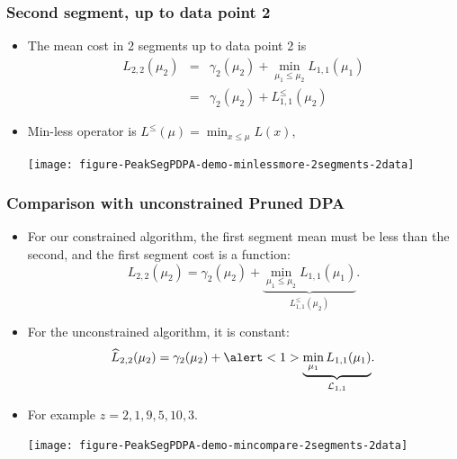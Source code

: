 \documentclass{beamer}
\begin{document}
\begin{frame}[fragile]
  \frametitle{Second segment, up to data point 2}
  \begin{itemize}
  \item The mean cost in 2 segments up to data point 2 is
\begin{eqnarray*}
  L_{2,2}(\mu_2) 
  &=&  \gamma_2(\mu_2)+\min_{\mu_1 \leq \mu_2} L_{1,1}(\mu_1)\\
  &=& \gamma_2(\mu_2)+L_{1,1}^{\leq}(\mu_2)
\end{eqnarray*}
\item Min-less operator is $L^\leq(\mu) = \min_{x\leq\mu} L(x),$
    \begin{center}
      \texttt{[image: figure-PeakSegPDPA-demo-minlessmore-2segments-2data]}
    \end{center}
\end{itemize}
\end{frame}

\begin{frame}
  \frametitle{Comparison with unconstrained Pruned DPA}
  \begin{itemize}
  \item For our constrained algorithm, the first segment mean must be
    less than the second, and the first segment cost is a function:
    \begin{equation*}
      L_{2,2}(\mu_2) = \gamma_2(\mu_2)+
      \underbrace{\min_{\mu_1 \leq \mu_2} L_{1,1}(\mu_1)}_{L^\leq_{1,1}(\mu_2)}.
    \end{equation*}
  \item For the unconstrained algorithm, it is \alert<1>{constant}:
    \begin{equation*}
      \widehat{L}_{2,2}(\mu_2) = \gamma_2(\mu_2)+
      \alert<1>{\underbrace{\min_{\mu_1} L_{1,1}(\mu_1)}_{\mathcal L_{1,1}}}.
    \end{equation*}
  \item For example $z = 2, 1, 9, 5, 10, 3$.
    \begin{center}
      \texttt{[image: figure-PeakSegPDPA-demo-mincompare-2segments-2data]}
    \end{center}
  \end{itemize}
\end{frame}
\end{document}
